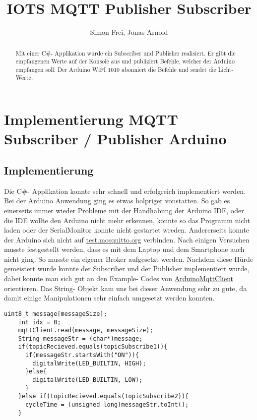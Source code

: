 \documentclass{article}
\title{IOTS MQTT Publisher Subscriber}
\author{Simon Frei, Jonas Arnold}
\begin{document}
\maketitle

\begin{abstract}
Mit einer C\#- Applikation wurde ein Subscriber und Publisher realisiert. Er gibt die empfangenen Werte auf der Konsole aus und publiziert Befehle, welcher der Arduino empfangen soll.
Der Arduino WiFI 1010 abonniert die Befehle und sendet die Licht- Werte.
\end{abstract}

\section{Implementierung MQTT Subscriber / Publisher Arduino}
\subsection{Implementierung}
Die C\#- Applikation konnte sehr schnell und erfolgreich implementiert werden. Bei der Arduino Anwendung ging es etwas holpriger vonstatten. So gab es einerseits immer wieder Probleme mit der Handhabung der Arduino IDE, oder die IDE wollte den Arduino nicht mehr erkennen, konnte so das Programm nicht laden oder der SerialMonitor konnte nicht gestartet wreden. Andererseits konnte
der Arduino sich nicht auf \url{test.mosquitto.org} verbinden. Nach einigen Versuchen musste festgestellt werden, dass es mit dem Laptop und dem Smartphone auch nicht ging. So musste ein eigener Broker aufgesetzt werden.\newline
Nachdem diese Hürde gemeistert wurde konnte der Subscriber und der Publisher implementiert wurde, dabei konnte man sich gut an den Example- Codes von  \href{https://github.com/arduino-libraries/ArduinoMqttClient}{ArduinoMqttClient} orientieren.\newline
Das String- Objekt kam uns bei dieser Anwendung sehr zu gute, da damit einige Manipulationen sehr einfach umgesetzt werden konnten.
\begin{lstlisting}[style=CStyle, caption=String Manipulationen]
    uint8_t message[messageSize];
    int idx = 0;
    mqttClient.read(message, messageSize); 
    String messageStr = (char*)message;  
    if(topicRecieved.equals(topicSubscribe1)){
      if(messageStr.startsWith("ON")){
        digitalWrite(LED_BUILTIN, HIGH);
      }else{
        digitalWrite(LED_BUILTIN, LOW);        
      }
    }else if(topicRecieved.equals(topicSubscribe2)){  
      cycleTime = (unsigned long)messageStr.toInt(); 
    }
\end{lstlisting}
\end{document}
